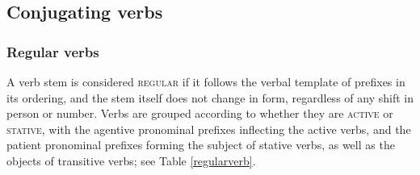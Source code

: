 \documentclass[output=paper]{LSP/langsci}
\begin{document}
\subsection{Conjugating verbs}
\subsubsection{Regular verbs}  A verb stem is considered \textsc{regular} if it follows the verbal template of prefixes in its ordering, and the stem itself does not change in form, regardless of any shift in person or number.  Verbs are grouped according to whether they are \textsc{active} or \textsc{stative}, with the agentive pronominal prefixes inflecting the active verbs, and the patient pronominal prefixes forming the subject of stative verbs, as well as the objects of transitive verbs; see Table \ref{regularverb}. 
\end{document}
